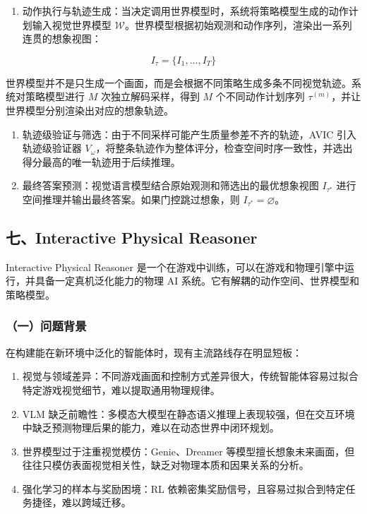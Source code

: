 \begin{enumerate}
\def\labelenumi{\arabic{enumi}.}
\setcounter{enumi}{1}
\tightlist
\item
  动作执行与轨迹生成：当决定调用世界模型时，系统将策略模型生成的动作计划输入视觉世界模型 \(\mathcal{W}\)。世界模型根据初始观测和动作序列，渲染出一系列连贯的想象视图：
\end{enumerate}

\[
I_\tau = \{I_1, \ldots, I_T\}
\]

世界模型并不是只生成一个画面，而是会根据不同策略生成多条不同视觉轨迹。系统对策略模型进行 \(M\) 次独立解码采样，得到 \(M\) 个不同动作计划序列 \(\tau^{(m)}\)，并让世界模型分别渲染出对应的想象轨迹。

\begin{enumerate}
\def\labelenumi{\arabic{enumi}.}
\setcounter{enumi}{2}
\tightlist
\item
  轨迹级验证与筛选：由于不同采样可能产生质量参差不齐的轨迹，AVIC 引入轨迹级验证器 \(V_\omega\)，将整条轨迹作为整体评分，检查空间时序一致性，并选出得分最高的唯一轨迹用于后续推理。
\item
  最终答案预测：视觉语言模型结合原始观测和筛选出的最优想象视图 \(I_{\tau^*}\) 进行空间推理并输出最终答案。如果门控跳过想象，则 \(I_{\tau^*} = \varnothing\)。
\end{enumerate}

\hypertarget{ux4e03interactive-physical-reasoner}{%
\subsection{七、Interactive Physical Reasoner}\label{ux4e03interactive-physical-reasoner}}

Interactive Physical Reasoner 是一个在游戏中训练，可以在游戏和物理引擎中运行，并具备一定真机泛化能力的物理 AI 系统。它有解耦的动作空间、世界模型和策略模型。

\hypertarget{ux4e00ux95eeux9898ux80ccux666f-20}{%
\subsubsection{（一）问题背景}\label{ux4e00ux95eeux9898ux80ccux666f-20}}

在构建能在新环境中泛化的智能体时，现有主流路线存在明显短板：

\begin{enumerate}
\def\labelenumi{\arabic{enumi}.}
\tightlist
\item
  视觉与领域差异：不同游戏画面和控制方式差异很大，传统智能体容易过拟合特定游戏视觉细节，难以提取通用物理规律。
\item
  VLM 缺乏前瞻性：多模态大模型在静态语义推理上表现较强，但在交互环境中缺乏预测物理后果的能力，难以在动态世界中闭环规划。
\item
  世界模型过于注重视觉模仿：Genie、Dreamer 等模型擅长想象未来画面，但往往只模仿表面视觉相关性，缺乏对物理本质和因果关系的分析。
\item
  强化学习的样本与奖励困境：RL 依赖密集奖励信号，且容易过拟合到特定任务捷径，难以跨域迁移。
\end{enumerate}

